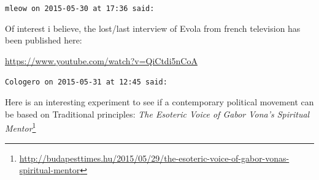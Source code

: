 \begin{footnotesize}
\begin{sffamily}
\hfill

\texttt{mleow on 2015-05-30 at 17:36 said:}

Of interest i believe, the lost/last interview of Evola from french television has been published here:

\url{https://www.youtube.com/watch?v=QiCtdi5nCoA}


\hfill

\texttt{Cologero on 2015-05-31 at 12:45 said:}

Here is an interesting experiment to see if a contemporary political movement can be based on Traditional principles: \textit{The Esoteric Voice of Gabor Vona's Spiritual Mentor}\footnote{\url{http://budapesttimes.hu/2015/05/29/the-esoteric-voice-of-gabor-vonas-spiritual-mentor}}

\hfill

\end{sffamily}
\end{footnotesize}


